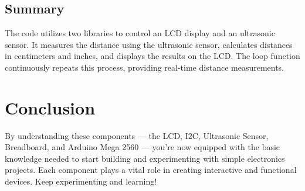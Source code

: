 \documentclass{article}
\begin{document}
\subsection{Summary}

The code utilizes two libraries to control an LCD display and an ultrasonic sensor. It measures the distance using the ultrasonic sensor, calculates distances in centimeters and inches, and displays the results on the LCD. The loop function continuously repeats this process, providing real-time distance measurements. 

\section{Conclusion}
By understanding these components — the LCD, I2C, Ultrasonic Sensor, Breadboard, and Arduino Mega 2560 — you're now equipped with the basic knowledge needed to start building and experimenting with simple electronics projects. Each component plays a vital role in creating interactive and functional devices. Keep experimenting and learning!
\end{document}
